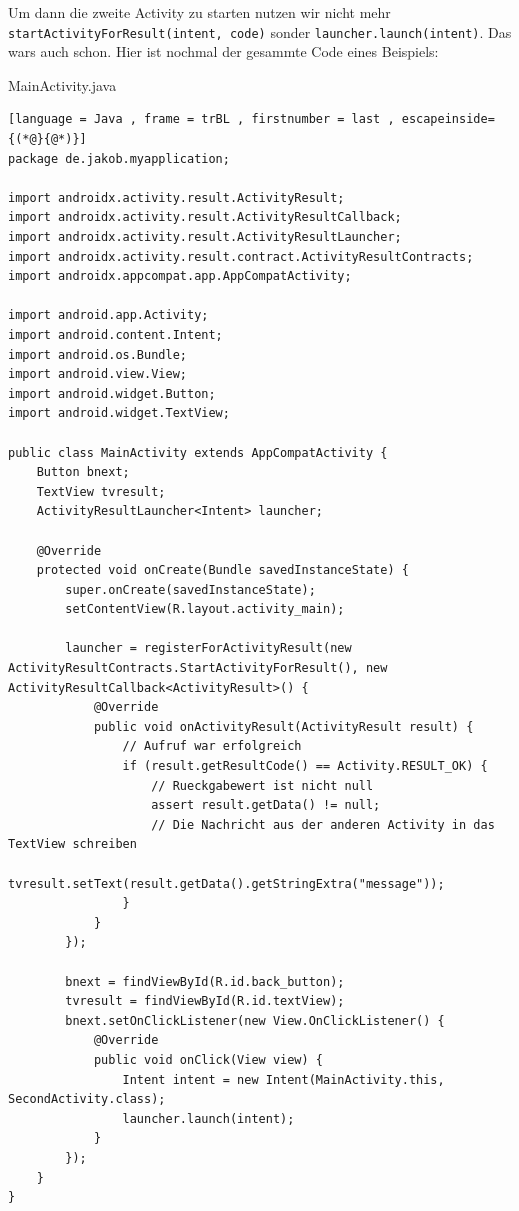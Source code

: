\documentclass[8pt, letterpaper]{article}
\begin{document}
Um dann die zweite Activity zu starten nutzen wir nicht mehr \texttt{startActivityForResult(intent, code)} sonder \texttt{launcher.launch(intent)}.
Das wars auch schon. Hier ist nochmal der gesammte Code eines Beispiels:
\pagebreak

MainActivity.java
\begin{lstlisting}[language = Java , frame = trBL , firstnumber = last , escapeinside={(*@}{@*)}]
package de.jakob.myapplication;

import androidx.activity.result.ActivityResult;
import androidx.activity.result.ActivityResultCallback;
import androidx.activity.result.ActivityResultLauncher;
import androidx.activity.result.contract.ActivityResultContracts;
import androidx.appcompat.app.AppCompatActivity;

import android.app.Activity;
import android.content.Intent;
import android.os.Bundle;
import android.view.View;
import android.widget.Button;
import android.widget.TextView;

public class MainActivity extends AppCompatActivity {
    Button bnext;
    TextView tvresult;
    ActivityResultLauncher<Intent> launcher;

    @Override
    protected void onCreate(Bundle savedInstanceState) {
        super.onCreate(savedInstanceState);
        setContentView(R.layout.activity_main);

        launcher = registerForActivityResult(new ActivityResultContracts.StartActivityForResult(), new ActivityResultCallback<ActivityResult>() {
            @Override
            public void onActivityResult(ActivityResult result) {
                // Aufruf war erfolgreich
                if (result.getResultCode() == Activity.RESULT_OK) {
                    // Rueckgabewert ist nicht null
                    assert result.getData() != null;
                    // Die Nachricht aus der anderen Activity in das TextView schreiben
                    tvresult.setText(result.getData().getStringExtra("message"));
                }
            }
        });

        bnext = findViewById(R.id.back_button);
        tvresult = findViewById(R.id.textView);
        bnext.setOnClickListener(new View.OnClickListener() {
            @Override
            public void onClick(View view) {
                Intent intent = new Intent(MainActivity.this, SecondActivity.class);
                launcher.launch(intent);
            }
        });
    }
}
\end{lstlisting}

% 
\end{document}
